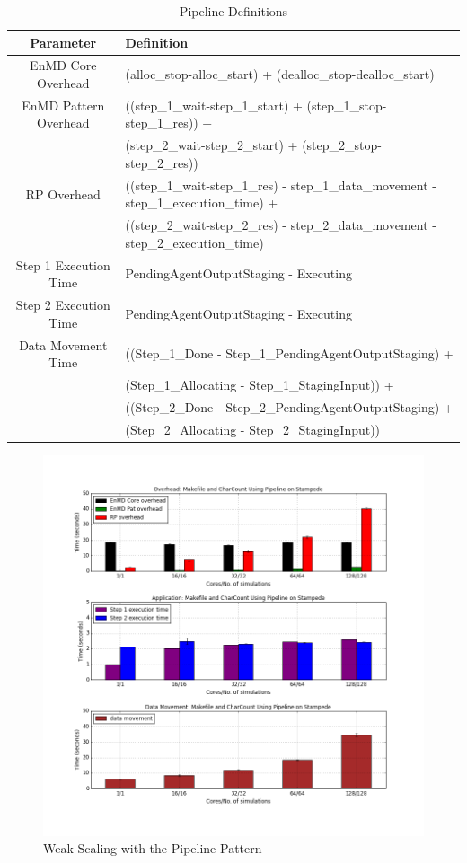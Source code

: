 \documentclass[]{article}
\begin{document}
		\begin{table}[h!]
		\centering
			\begin{tabular}{|c|p{10cm}|}
				\hline
				Parameter & Definition  \\
				\hline
				EnMD Core Overhead & (alloc\_stop-alloc\_start) +  (dealloc\_stop-dealloc\_start) \\
				\hline
				EnMD Pattern Overhead & ((step\_1\_wait-step\_1\_start) + (step\_1\_stop-step\_1\_res)) + \\ 
									  &	(step\_2\_wait-step\_2\_start) + (step\_2\_stop-step\_2\_res)) \\
				\hline
				RP Overhead & ((step\_1\_wait-step\_1\_res) - step\_1\_data\_movement - step\_1\_execution\_time) + \\
							&	((step\_2\_wait-step\_2\_res) - step\_2\_data\_movement - step\_2\_execution\_time) \\
				\hline
				Step 1 Execution Time & PendingAgentOutputStaging - Executing \\
				\hline
				Step 2 Execution Time & PendingAgentOutputStaging - Executing \\
				\hline
				Data Movement Time & ((Step\_1\_Done - Step\_1\_PendingAgentOutputStaging) + \\ 
								   &	(Step\_1\_Allocating - Step\_1\_StagingInput)) + \\
								   &	((Step\_2\_Done - Step\_2\_PendingAgentOutputStaging) + \\
								   &	(Step\_2\_Allocating - Step\_2\_StagingInput)) \\
				\hline
			\end{tabular}
			\caption{Pipeline Definitions}
		\end{table}

		\begin{figure}[h!]
			\centering
			\includegraphics[scale=.30]{iteration_3/pipeline_weak_scaling.png}
			\caption{Weak Scaling with the Pipeline Pattern}
			\label{fig:pipeline_weak_scaling}
		\end{figure}
\end{document}
